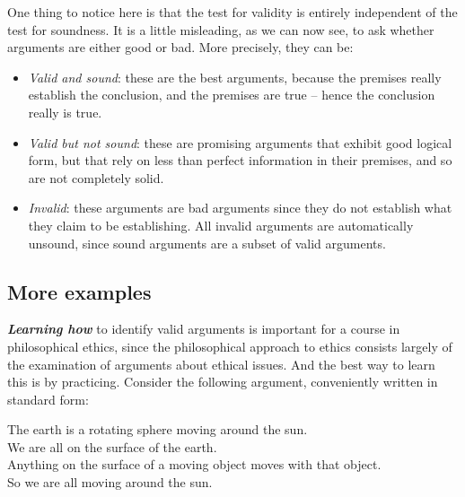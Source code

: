 \documentclass[12pt, openany]{book}
\begin{document}
One thing to notice here is that the test for validity is entirely independent of the test for soundness. It is a little misleading, as we can now see, to ask whether arguments are either good or bad. More precisely, they can be:

\begin{itemize}
\item
  \emph{Valid and sound}: these are the best arguments, because the premises really establish the conclusion, and the premises are true -- hence the conclusion really is true.
\item
  \emph{Valid but not sound}: these are promising arguments that exhibit good logical form, but that rely on less than perfect information in their premises, and so are not completely solid.
\item
  \emph{Invalid}: these arguments are bad arguments since they do not establish what they claim to be establishing. All invalid arguments are automatically unsound, since sound arguments are a subset of valid arguments.
\end{itemize}

\hypertarget{more-examples}{%
\subsection*{More examples}\label{more-examples}}


\textbf{\emph{Learning how}} to identify valid arguments is important for a course in philosophical ethics, since the philosophical approach to ethics consists largely of the examination of arguments about ethical issues. And the best way to learn this is by practicing. Consider the following argument, conveniently written in standard form:

\begin{center}

\begin{argument}

The earth is a rotating sphere moving around the sun.\\
We are all on the surface of the earth.\\
Anything on the surface of a moving object moves with that object.\\

So we are all moving around the sun.

\end{argument}

\end{center}
\end{document}
